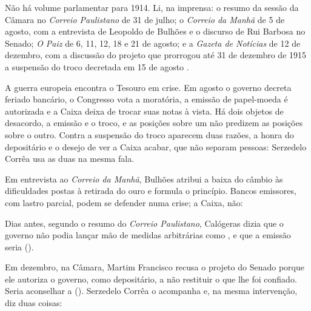 

Não há volume parlamentar para 1914. Li, na imprensa: o resumo da sessão da
Câmara no \textit{Correio Paulistano} de 31 de julho; o \textit{Correio da
Manhã} de 5 de agosto, com a entrevista de Leopoldo de Bulhões e o discurso de
Rui Barbosa no Senado; \textit{O Paiz} de 6, 11, 12, 18 e 21 de agosto; e a
\textit{Gazeta de Notícias} de 12 de dezembro, com a discussão do projeto que
prorrogou até 31 de dezembro de 1915 a suspensão do troco decretada em 15 de
agosto \cite{brasil1914suspensao}.


A guerra europeia encontra o Tesouro em crise. Em agosto o governo decreta
feriado bancário, o Congresso vota a moratória, a emissão de papel-moeda é
autorizada \cite{brasil1914emissao} e a Caixa deixa de trocar suas notas à
vista. Há dois
objetos de desacordo, a emissão e o troco, e as posições sobre um não predizem
as posições sobre o outro. Contra a suspensão do troco aparecem duas razões, a
honra do depositário e o desejo de ver a Caixa acabar, que não separam pessoas:
Serzedelo Corrêa usa as duas na mesma fala.


Em entrevista ao \textit{Correio da Manhã}, Bulhões atribui a baixa do câmbio
às dificuldades postas à retirada do ouro e formula o princípio. Bancos
emissores, com lastro parcial, podem se defender numa crise; a Caixa, não:


Dias antes, segundo o resumo do \textit{Correio Paulistano}, Calógeras dizia
que o governo não podia lançar mão de medidas arbitrárias como
, e
que a emissão seria 
().

Em dezembro, na Câmara, Martim Francisco recusa o projeto do Senado porque ele
autoriza o governo, como depositário, a não restituir o que lhe foi confiado.
Seria aconselhar a  (). Serzedelo
Corrêa o acompanha e, na mesma intervenção, diz duas coisas:

